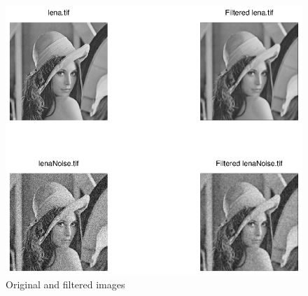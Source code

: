 \documentclass[DIN, pagenumber=false, fontsize=11pt, parskip=half]{scrartcl}
\begin{document}
\begin{enumerate}
\begin{figure}[H]
                \includegraphics[trim = {0 9cm 27cm 0}, clip,width=\textwidth]{BoxFilter}
                \caption{Original and filtered images}
            \end{figure} 
    \end{enumerate}
\end{document}
